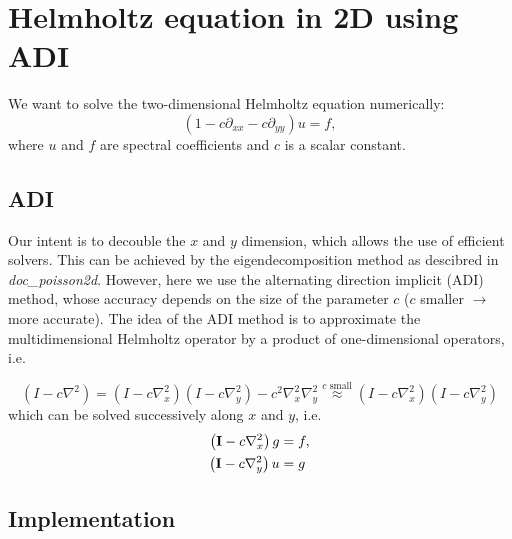 \documentclass[10pt,a4paper]{article}
\begin{document}
\section*{Helmholtz equation in 2D using ADI}
We want to solve the two-dimensional Helmholtz equation numerically:
\begin{equation}
(1  - c \partial_{xx} - c \partial_{yy}) u = f,
\end{equation}
where $u$ and $f$ are spectral coefficients and $c$ is a scalar constant. 

\subsection*{ADI}
Our intent is to decouble the $x$ and $y$ dimension, which allows the use of efficient solvers. This can be achieved by the eigendecomposition method as descibred in \textit{doc\_poisson2d}. However, here we use the alternating direction implicit (ADI) method, whose accuracy depends on the size of the parameter $c$ ($c$ smaller $\rightarrow$ more accurate). The idea of the ADI method is to approximate the multidimensional Helmholtz operator by a product of one-dimensional operators, i.e. 

\begin{equation}
    \left(I - c\nabla^2\right) = \left( I - c\nabla^2_{x} \right) \left( I - c\nabla^2_{y} \right) - c^2\nabla^2_x \nabla^2_y \stackrel{c \text{ small}}{\approx} \left( I - c\nabla^2_{x} \right) \left( I - c\nabla^2_{y} \right)
    \label{eq:2}
\end{equation}
which can be solved successively along $x$ and $y$, i.e.
\begin{align}
     \left( \mathbf{I} - c\nabla^2_{x} \right) g &= f, \notag\\
     \left( \mathbf{I} - c\nabla^2_{y} \right) u &= g
     \label{eq:3}
\end{align}

\subsection*{Implementation}
\end{document}
